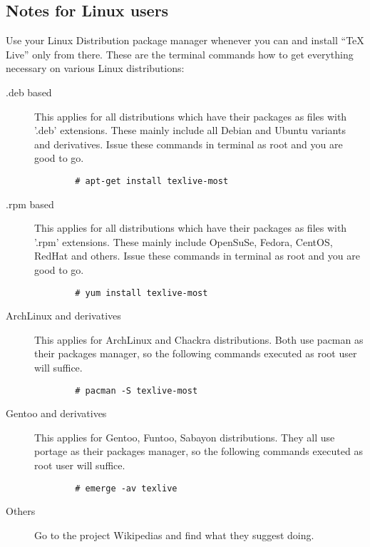 \documentclass[a4paper]{article}
\begin{document}
\subsection{Notes for Linux users}

Use your Linux Distribution package manager whenever you can and install ``\TeX
Live'' only from there. These are the terminal commands how to get everything
necessary on various Linux distributions:

\begin{description}
    \item[.deb based] 
        This applies for all distributions which have their packages as files
        with '.deb' extensions. These mainly include all Debian and Ubuntu
        variants and derivatives. Issue these commands in terminal as root and
        you are good to go.
        \begin{verbatim}
        # apt-get install texlive-most
        \end{verbatim}

    \item[.rpm based]
        This applies for all distributions which have their packages as files
        with '.rpm' extensions. These mainly include OpenSuSe, Fedora, CentOS,
        RedHat and others. Issue these commands in terminal as root and you are
        good to go.
        \begin{verbatim}
        # yum install texlive-most
        \end{verbatim}

    \item[ArchLinux and derivatives]
        This applies for ArchLinux and Chackra distributions. Both use pacman as
        their packages manager, so the following commands executed as
        root user will suffice.
        \begin{verbatim}
        # pacman -S texlive-most
        \end{verbatim}
    \item[Gentoo and derivatives]
        This applies for Gentoo, Funtoo, Sabayon distributions. They all use
        portage as their packages manager, so the following commands executed as
        root user will suffice.
        \begin{verbatim}
        # emerge -av texlive
        \end{verbatim}
    \item[Others]
        Go to the project Wikipedias and find what they suggest doing.
\end{description}
\end{document}
